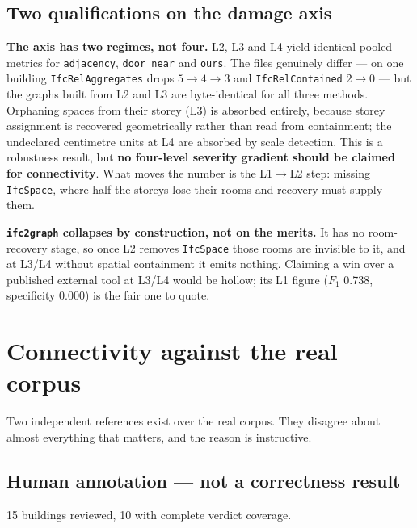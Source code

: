 \documentclass[11pt,a4paper]{article}
\newcommand{\code}[1]{\texttt{\small #1}}
\begin{document}
\subsection{Two qualifications on the damage axis}

\textbf{The axis has two regimes, not four.} L2, L3 and L4 yield identical
pooled metrics for \code{adjacency}, \code{door\_near} and \code{ours}. The
files genuinely differ --- on one building \code{IfcRelAggregates} drops
$5\!\to\!4\!\to\!3$ and \code{IfcRelContained} $2\!\to\!0$ --- but the graphs
built from L2 and L3 are byte-identical for all three methods. Orphaning spaces
from their storey (L3) is absorbed entirely, because storey assignment is
recovered geometrically rather than read from containment; the undeclared
centimetre units at L4 are absorbed by scale detection. This is a robustness
result, but \textbf{no four-level severity gradient should be claimed for
connectivity}. What moves the number is the L1$\to$L2 step: missing
\code{IfcSpace}, where half the storeys lose their rooms and recovery must
supply them.

\textbf{\code{ifc2graph} collapses by construction, not on the merits.} It has
no room-recovery stage, so once L2 removes \code{IfcSpace} those rooms are
invisible to it, and at L3/L4 without spatial containment it emits nothing.
Claiming a win over a published external tool at L3/L4 would be hollow; its L1
figure ($F_1$ 0.738, specificity 0.000) is the fair one to quote.

\section{Connectivity against the real corpus}

Two independent references exist over the real corpus. They disagree about
almost everything that matters, and the reason is instructive.

\subsection{Human annotation --- not a correctness result}

15 buildings reviewed, 10 with complete verdict coverage.
\end{document}
